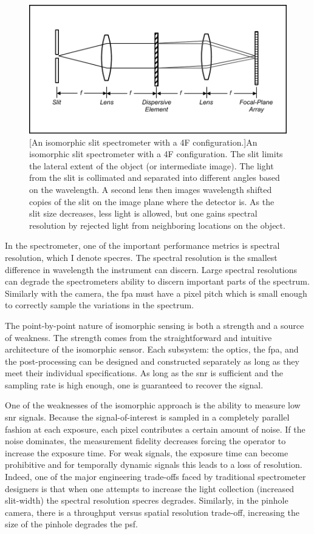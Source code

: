 \begin{figure}
    \includegraphics[scale=1]{slitspectrometer}
    [An isomorphic slit spectrometer with a 4F configuration.]{An isomorphic slit spectrometer with a 4F configuration. The slit limits the lateral extent of the object (or intermediate image). The light from the slit is collimated and separated into different angles based on the wavelength. A second lens then images wavelength shifted copies of the slit on the image plane where the detector is. As the slit size decreases, less light is allowed, but one gains spectral resolution by rejected light from neighboring locations on the object. }
    \label{fig:slitspectrometer}
\end{figure}

In the spectrometer, one of the important performance metrics is \gls{spectral resolution}, which I denote \gls{specres}. The spectral resolution is the smallest difference in wavelength the instrument can discern. Large spectral resolutions can degrade the spectrometers ability to discern important parts of the spectrum. Similarly with the camera, the \gls{fpa} must have a \gls{pixel pitch} which is small enough to correctly sample the variations in the spectrum. 

The point-by-point nature of isomorphic sensing is both a strength and a source of weakness. The strength comes from the straightforward and intuitive architecture of the isomorphic sensor. Each subsystem: the optics, the \acrfull{fpa}, and the post-processing can be designed and constructed separately as long as they meet their individual specifications. As long as the \gls{snr} is sufficient and the sampling rate is high enough, one is guaranteed to recover the signal. 

One of the weaknesses of the isomorphic approach is the ability to measure low \gls{snr} signals. Because the signal-of-interest is sampled in a completely parallel fashion at each exposure, each pixel contributes a certain amount of noise. If the noise dominates, the measurement fidelity decreases forcing the operator to increase the exposure time. For weak signals, the exposure time can become prohibitive and for temporally dynamic signals this leads to a loss of resolution. Indeed, one of the major engineering trade-offs faced by traditional spectrometer designers is that when one attempts to increase the light collection (increased slit-width) the spectral resolution \gls{specres} degrades. Similarly, in the pinhole camera, there is a throughput versus spatial resolution trade-off, increasing the size of the pinhole degrades the \gls{psf}.

